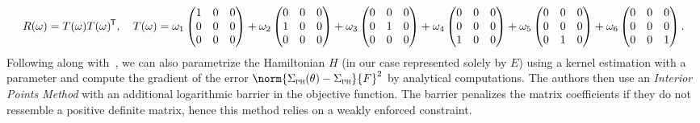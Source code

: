 \begin{equation}
    R(\omega) = T(\omega) T(\omega)^{\mkern-1.5mu \mathsf{T}},\quad T(\omega) = \omega_1 \begin{pmatrix}
        1 & 0 & 0 \\
        0 & 0 & 0 \\
        0 & 0 & 0
    \end{pmatrix} + \omega_2 \begin{pmatrix}
        0 & 0 & 0 \\
        1 & 0 & 0 \\
        0 & 0 & 0
    \end{pmatrix} + \omega_3 \begin{pmatrix}
        0 & 0 & 0 \\
        0 & 1 & 0 \\
        0 & 0 & 0
    \end{pmatrix} + \omega_4 \begin{pmatrix}
        0 & 0 & 0 \\
        0 & 0 & 0 \\
        1 & 0 & 0
    \end{pmatrix} + \omega_5 \begin{pmatrix}
        0 & 0 & 0 \\
        0 & 0 & 0 \\
        0 & 1 & 0
    \end{pmatrix} + \omega_6 \begin{pmatrix}
        0 & 0 & 0 \\
        0 & 0 & 0 \\
        0 & 0 & 1
    \end{pmatrix}.
\end{equation}
Following along with~\cite{Najnudel2021}, we can also parametrize the Hamiltonian $H$ (in our case represented solely by $E$) using a kernel estimation with a parameter and compute the gradient of the error $\norm{\Sigma_\msc{ph}(\theta) - \Sigma_\msc{ph}}{F}^2$ by analytical computations.
The authors then use an \emph{Interior Points Method} with an additional logarithmic barrier in the objective function.
The barrier penalizes the matrix coefficients if they do not ressemble a positive definite matrix, hence this method relies on a weakly enforced constraint.



